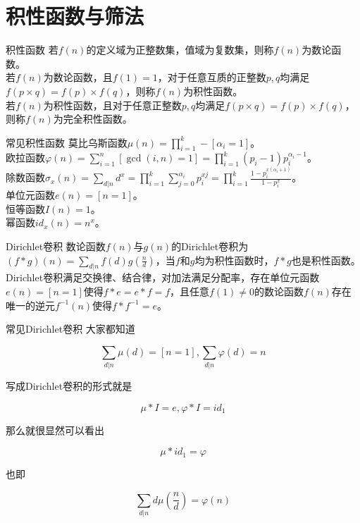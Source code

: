 \documentclass{beamer}
\begin{document}
	\section{积性函数与筛法}
	\begin{frame}{积性函数}
		若$f(n)$的定义域为正整数集，值域为复数集，则称$f(n)$为数论函数。
		\\
		
		若$f(n)$为数论函数，且$f(1)=1$，对于任意互质的正整数$p,q$均满足$f(p \times q) = f(p) \times f(q)$，则称$f(n)$为积性函数。
		\\
		
		若$f(n)$为积性函数，且对于任意正整数$p,q$均满足$f(p \times q) = f(p) \times f(q)$，则称$f(n)$为完全积性函数。
	\end{frame}
	\begin{frame}{常见积性函数}
		莫比乌斯函数$\mu(n)=\prod_{i=1}^k-[\alpha_i=1]$。
		\\
		
		欧拉函数$\varphi(n)=\sum_{i=1}^n[\gcd(i,n)=1]=\prod_{i=1}^k(p_i-1)p_i^{\alpha_i-1}$。
		\\
		
		除数函数$\sigma_x(n)=\sum_{d|n}d^x=\prod_{i=1}^k\sum_{j=0}^{\alpha_i}p_i^{xj}=\prod_{i=1}^k\frac{1-p_i^{x(\alpha_i+1)}}{1-p_i^x}$。
		\\
		
		单位元函数$e(n)=[n=1]$。
		\\
		
		恒等函数$I(n)=1$。
		\\
		
		幂函数$id_x(n)=n^x$。
	\end{frame}
	\begin{frame}{Dirichlet卷积}
		数论函数$f(n)$与$g(n)$的Dirichlet卷积为$(f*g)(n)=\sum_{d|n}f(d)g(\frac nd)$，当$f$和$g$均为积性函数时，$f * g$也是积性函数。
		\\

		Dirichlet卷积满足交换律、结合律，对加法满足分配率，存在单位元函数$e(n)=[n=1]$使得$f*e=e*f=f$，且任意$f(1)\neq 0$的数论函数$f(n)$存在唯一的逆元$f^{-1}(n)$使得$f*f^{-1}=e$。
	\end{frame}
	\begin{frame}{常见Dirichlet卷积}
		\pause
		大家都知道
		
		$$\sum_{d|n}\mu(d)=[n=1],\sum_{d|n}\varphi(d)=n$$
		\pause
		
		写成Dirichlet卷积的形式就是
		
		$$\mu * I = e, \varphi * I = id_1$$
		\pause
		
		那么就很显然可以看出
		
		$$\mu * id_1 = \varphi$$
		\pause
		
		也即
		
		$$\sum_{d|n}d\mu(\frac{n}{d})=\varphi(n)$$
	\end{frame}
\end{document}
